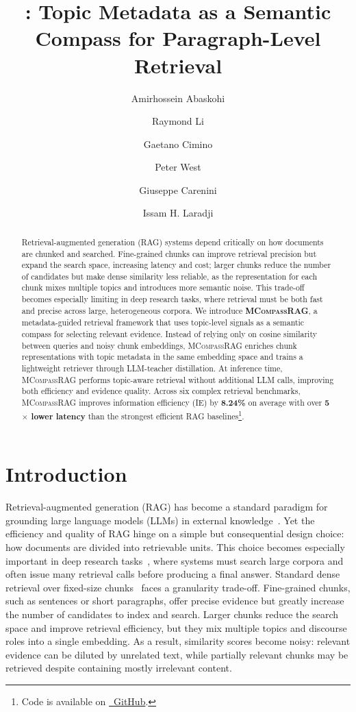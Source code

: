 \documentclass{llmxive}
\title{\logo \name{}: Topic Metadata as a Semantic Compass for Paragraph-Level Retrieval}
\author{Amirhossein Abaskohi \and Raymond Li \and Gaetano Cimino \and Peter West \and Giuseppe Carenini \and Issam H. Laradji}
\providecommand{\name}[1]{\textsc{MCompassRAG}\xspace}
\begin{document}
\maketitle
\begin{abstract}
Retrieval-augmented generation (RAG) systems depend critically on how documents are chunked and searched. Fine-grained chunks can improve retrieval precision but expand the search space, increasing latency and cost; larger chunks reduce the number of candidates but make dense similarity less reliable, as the representation for each chunk mixes multiple topics and introduces more semantic noise. This trade-off becomes especially limiting in deep research tasks, where retrieval must be both fast and precise across large, heterogeneous corpora. We introduce \textbf{\name{}}, a metadata-guided retrieval framework that uses topic-level signals as a semantic compass for selecting relevant evidence. Instead of relying only on cosine similarity between queries and noisy chunk embeddings, \name{} enriches chunk representations with topic metadata in the same embedding space and trains a lightweight retriever through LLM-teacher distillation. At inference time, \name{} performs topic-aware retrieval without additional LLM calls, improving both efficiency and evidence quality. Across six complex retrieval benchmarks, \name{} improves information efficiency (IE) by \textbf{8.24\%} on average with over \textbf{5$\times$ lower latency} than the strongest efficient RAG baselines\footnote{
Code is available on \href{https://github.com/AmirAbaskohi/MCompassRAG}
{{}~GitHub}.
}.
\end{abstract}


\section{Introduction}

Retrieval-augmented generation (RAG) has become a standard paradigm for grounding large language models (LLMs) in external knowledge~\cite{lewis2020retrieval, karpukhin-etal-2020-dense}. Yet the efficiency and quality of RAG hinge on a simple but consequential design choice: how documents are divided into retrievable units. This choice becomes especially important in deep research tasks~\cite{zhang2025deepresearchsurveyautonomous}, where systems must search large corpora and often issue many retrieval calls before producing a final answer. Standard dense retrieval over fixed-size chunks~\cite{10.1145/3637870} faces a granularity trade-off. Fine-grained chunks, such as sentences or short paragraphs, offer precise evidence but greatly increase the number of candidates to index and search. Larger chunks reduce the search space and improve retrieval efficiency, but they mix multiple topics and discourse roles into a single embedding. As a result, similarity scores become noisy: relevant evidence can be diluted by unrelated text, while partially relevant chunks may be retrieved despite containing mostly irrelevant content.
\end{document}

